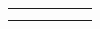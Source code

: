 {\begin{center}
\begin{xtabular*}{\mytablewidth}[t]{|p{10\mystarwidth}|p{10\mystarwidth}|p{10\mystarwidth}|p{10\mystarwidth}|p{10\mystarwidth}|p{10\mystarwidth}|}
    
         &
    
    
         &
    
    
         &
    
    
         &
    
    
         &
    
    
     \tabularnewline{}
    
    
         &
    
    
         &
    
    
         &
    

\end{xtabular*}
\end{center}}
